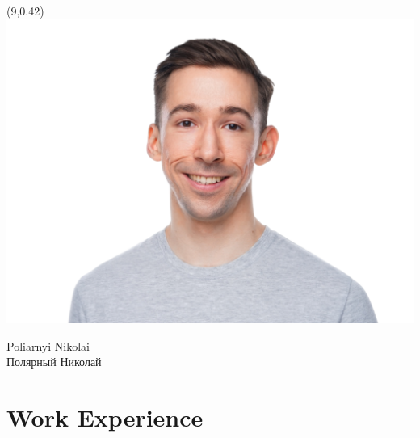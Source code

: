 \documentclass[11pt,oneside]{article}
\begin{document}
\begin{textblock}{7}(9,0.42)
    \includegraphics[scale=0.6]{photo2025.png}
\end{textblock}

\begin{center}
	{\huge Poliarnyi Nikolai \\ Полярный Николай}
\end{center}

\vspace{-9pt}
\section*{\textbf{Work Experience}}
\vspace{-9pt}
\end{document}
